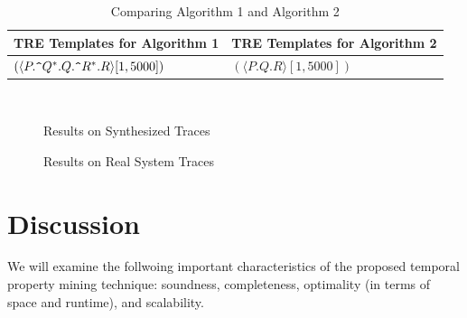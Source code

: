 \documentclass[]{sigplanconf}
\begin{document}


\begin{table}[t]
	\centering
	\begin{tabular}{|l|l|}
		\hline
		\textbf{TRE Templates for Algorithm 1} & \textbf{TRE Templates for Algorithm 2} \\
		\hline
		 $(\langle P.\verb!^!Q^*.Q.\verb!^!R^*.R \rangle [1, 5000])$& $(\langle P.Q.R \rangle [1, 5000])$ \\
	\end{tabular}

	\caption{Comparing Algorithm 1 and Algorithm 2}
	\label{miningOverhead}
\end{table}

\begin{figure}
  \centering
  \\
  \caption{Results on Synthesized Traces}\label{Algs_synth}
\end{figure}

\begin{figure}
  \centering
  \caption{Results on Real System Traces}\label{Algs_real}
\end{figure}

\section{Discussion} \label{discussion}

We will examine the follwoing important characteristics of the proposed temporal property mining technique: soundness, completeness, optimality (in terms of space and runtime), and scalability.
\end{document}
